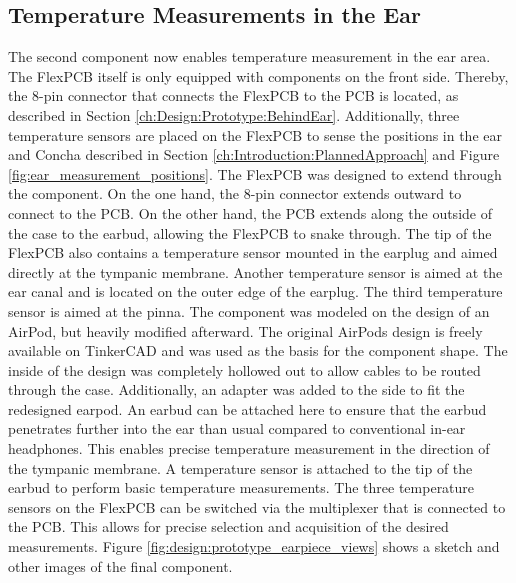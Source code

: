 
\subsection{Temperature Measurements in the Ear}
\label{ch:Design:Prototype:Earpiece}

The second component now enables temperature measurement in the ear area. The FlexPCB itself is only equipped with components on the front side. Thereby, the 8-pin connector that connects the FlexPCB to the PCB is located, as described in Section \ref{ch:Design:Prototype:BehindEar}.
Additionally, three temperature sensors are placed on the FlexPCB to sense the positions in the ear and Concha described in Section \ref{ch:Introduction:PlannedApproach} and Figure \ref{fig:ear_measurement_positions}.
The FlexPCB was designed to extend through the component. 
On the one hand, the 8-pin connector extends outward to connect to the PCB. 
On the other hand, the PCB extends along the outside of the case to the earbud, allowing the FlexPCB to snake through. 
The tip of the FlexPCB also contains a temperature sensor mounted in the earplug and aimed directly at the tympanic membrane. 
Another temperature sensor is aimed at the ear canal and is located on the outer edge of the earplug. The third temperature sensor is aimed at the pinna.
The component was modeled on the design of an AirPod, but heavily modified afterward. 
The original AirPods design is freely available on TinkerCAD and was used as the basis for the component shape. 
The inside of the design was completely hollowed out to allow cables to be routed through the case. Additionally, an adapter was added to the side to fit the redesigned earpod. 
An earbud can be attached here to ensure that the earbud penetrates further into the ear than usual compared to conventional in-ear headphones. 
This enables precise temperature measurement in the direction of the tympanic membrane. A temperature sensor is attached to the tip of the earbud to perform basic temperature measurements.
The three temperature sensors on the FlexPCB can be switched via the multiplexer that is connected to the PCB. 
This allows for precise selection and acquisition of the desired measurements. Figure \ref{fig:design:prototype_earpiece_views} shows a sketch and other images of the final component.

